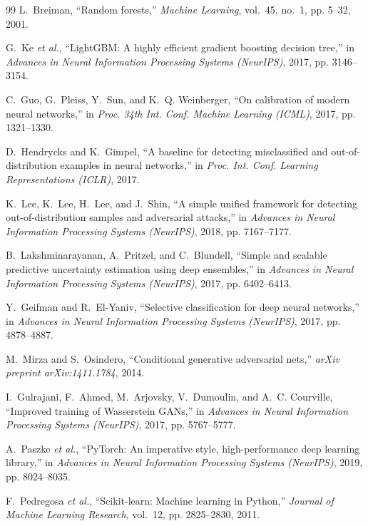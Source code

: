 \documentclass[conference]{IEEEtran}
\begin{document}
\begin{thebibliography}{99}
L.~Breiman, ``Random forests,'' \textit{Machine Learning}, vol.~45, no.~1, pp. 5--32, 2001.

G.~Ke \textit{et al.}, ``LightGBM: A highly efficient gradient boosting decision tree,'' in \textit{Advances in Neural Information Processing Systems (NeurIPS)}, 2017, pp. 3146--3154.

C.~Guo, G.~Pleiss, Y.~Sun, and K.~Q. Weinberger, ``On calibration of modern neural networks,'' in \textit{Proc. 34th Int. Conf. Machine Learning (ICML)}, 2017, pp. 1321--1330.

D.~Hendrycks and K.~Gimpel, ``A baseline for detecting misclassified and out-of-distribution examples in neural networks,'' in \textit{Proc. Int. Conf. Learning Representations (ICLR)}, 2017.

K.~Lee, K.~Lee, H.~Lee, and J.~Shin, ``A simple unified framework for detecting out-of-distribution samples and adversarial attacks,'' in \textit{Advances in Neural Information Processing Systems (NeurIPS)}, 2018, pp. 7167--7177.

B.~Lakshminarayanan, A.~Pritzel, and C.~Blundell, ``Simple and scalable predictive uncertainty estimation using deep ensembles,'' in \textit{Advances in Neural Information Processing Systems (NeurIPS)}, 2017, pp. 6402--6413.

Y.~Geifman and R.~El-Yaniv, ``Selective classification for deep neural networks,'' in \textit{Advances in Neural Information Processing Systems (NeurIPS)}, 2017, pp. 4878--4887.

M.~Mirza and S.~Osindero, ``Conditional generative adversarial nets,'' \textit{arXiv preprint arXiv:1411.1784}, 2014.

I.~Gulrajani, F.~Ahmed, M.~Arjovsky, V.~Dumoulin, and A.~C. Courville, ``Improved training of Wasserstein GANs,'' in \textit{Advances in Neural Information Processing Systems (NeurIPS)}, 2017, pp. 5767--5777.

A.~Paszke \textit{et al.}, ``PyTorch: An imperative style, high-performance deep learning library,'' in \textit{Advances in Neural Information Processing Systems (NeurIPS)}, 2019, pp. 8024--8035.

F.~Pedregosa \textit{et al.}, ``Scikit-learn: Machine learning in Python,'' \textit{Journal of Machine Learning Research}, vol.~12, pp. 2825--2830, 2011.

\end{thebibliography}
\end{document}
